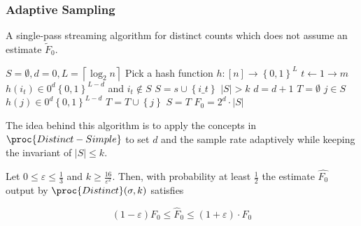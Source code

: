 \documentclass[../notes.tex]{subfiles}
\begin{document}
\subsubsection{Adaptive Sampling}

A single-pass streaming algorithm for distinct counts which does not assume an estimate $ \tilde{F}_0 $.


\begin{codebox}
\li $ S = \emptyset, d = 0, L = \left\lceil \log_2 n  \right\rceil  $
\li Pick a hash function $ h: [n] \to  \left\{ 0, 1 \right\} ^L $
\li \For $ t \gets 1 \to m $ \Do
\li     \If $ h(i_t) \in 0^d \left\{ 0, 1 \right\} ^{L-d}  $ and $ i_t \notin S $ \Then
\li         $S = s \cup \left\{ i\_t \right\} $ \End
\li     \While $ |S| > k $ \Do
\li     $  d= d+1$
\li     $ T = \emptyset $
\li     \For $ j \in S  $
\li         \If $ h(j) \in 0^d \left\{ 0, 1 \right\} ^{L-d} $ \Then
\li             $ T = T \cup \left\{ j \right\} $ \End
\li     $ S = T $ \End \End \End
\li \Return $ \hat{F}_0 = 2^d \cdot  |S| $
\end{codebox}

\begin{blockquote}
    The idea behind this algorithm is to apply the concepts in $ \proc{Distinct-Simple} $ to set $ d $ and the sample rate adaptively while keeping the invariant of $|S| \le k$.
\end{blockquote}


\begin{theorem}
    Let $ 0 \le \varepsilon \le  \frac{1}{3}  $ and $ k \ge  \frac{16}{\varepsilon^2} $. Then, with probability at least $ \frac{1}{2} $ the estimate $ \hat{F_0} $ output by $ \proc{Distinct}(\sigma, k) $ satisfies

    \begin{equation}
        (1-\varepsilon) F_0 \le  \hat{F}_0 \le (1+\varepsilon) \cdot F_0
    \end{equation}
\end{theorem}
\end{document}
